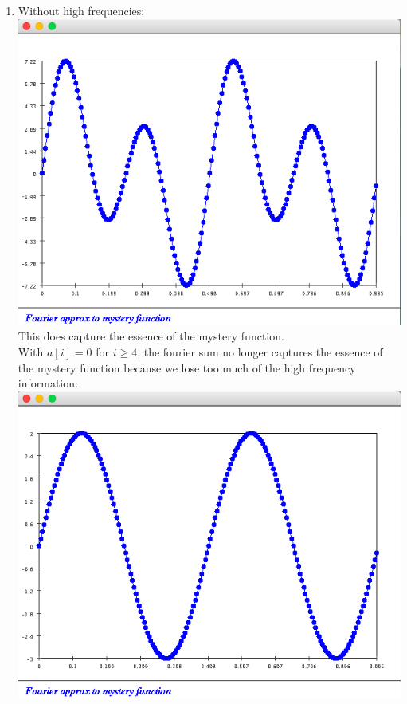 \documentclass{article}
\begin{document}
\begin{enumerate}
\item Without high frequencies: \\
\includegraphics[scale=0.5]{exercise5_no_high}\\
This does capture the essence of the mystery function. \\

With $a[i] = 0$ for $i \geq 4$, the fourier sum no longer captures the essence of the mystery function because we lose too much of the high frequency information:\\
\includegraphics[scale=0.5]{exercise6}


\end{enumerate}
\end{document}
